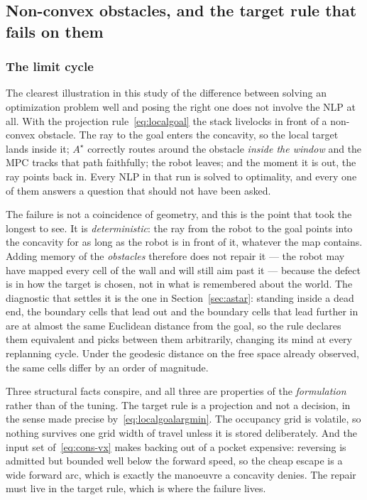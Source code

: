 \documentclass[11pt,a4paper]{article}
\newcommand{\astar}{$A^\star$}
\begin{document}
\subsection{Non-convex obstacles, and the target rule that fails on them}
\label{sec:nonconvex}

\subsubsection{The limit cycle}
\label{sec:localmin}

The clearest illustration in this study of the difference between solving an optimization problem well and
posing the right one does not involve the NLP at all. With the projection rule~\eqref{eq:localgoal} the
stack livelocks in front of a non-convex obstacle. The ray to the goal enters the concavity, so the local
target lands inside it; \astar{} correctly routes around the obstacle \emph{inside the window} and the MPC
tracks that path faithfully; the robot leaves; and the moment it is out, the ray points back in. Every NLP in
that run is solved to optimality, and every one of them answers a question that should not have been asked.

The failure is not a coincidence of geometry, and this is the point that took the longest to see. It is
\emph{deterministic}: the ray from the robot to the goal points into the concavity for as long as the robot
is in front of it, whatever the map contains. Adding memory of the \emph{obstacles} therefore does not repair
it --- the robot may have mapped every cell of the wall and will still aim past it --- because the defect is
in how the target is chosen, not in what is remembered about the world. The diagnostic that settles it is the
one in Section~\ref{sec:astar}: standing inside a dead end, the boundary cells that lead out and the boundary
cells that lead further in are at almost the same Euclidean distance from the goal, so the rule declares them
equivalent and picks between them arbitrarily, changing its mind at every replanning cycle. Under the
geodesic distance on the free space already observed, the same cells differ by an order of magnitude.

Three structural facts conspire, and all three are properties of the \emph{formulation} rather than of the
tuning. The target rule is a projection and not a decision, in the sense made precise
by~\eqref{eq:localgoalargmin}. The occupancy grid is volatile, so nothing survives one grid width of travel
unless it is stored deliberately. And the input set of~\eqref{eq:cons-vx} makes backing out of a pocket
expensive: reversing is admitted but bounded well below the forward speed, so the cheap escape is a wide
forward arc, which is exactly the manoeuvre a concavity denies. The repair must live in the target rule,
which is where the failure lives.
\end{document}
